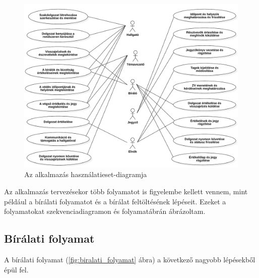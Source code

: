 \begin{figure}[ht]
\includegraphics[width=\textwidth]{images/UseCaseDiagram1.pdf}
\caption{Az alkalmazás használatieset-diagramja}
\label{fig:usecase}
\end{figure}
\newpage


Az alkalmazás tervezésekor több folyamatot is figyelembe kellett vennem, mint például a bírálati folyamatot és a bírálat feltöltésének lépéseit. Ezeket a folyamatokat szekvenciadiagramon és folyamatábrán ábrázoltam.

\subsection{Bírálati folyamat}

A bírálati folyamat (\ref{fig:biralati_folyamat} ábra) a következő nagyobb lépésekből épül fel.

